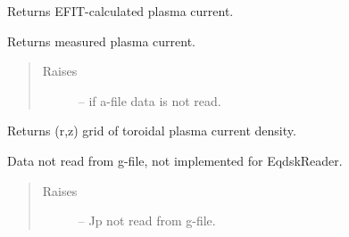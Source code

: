 \documentclass[letterpaper,10pt,english]{sphinxmanual}
\begin{document}
\begin{fulllineitems}
\begin{fulllineitems}
\begin{quote}
\begin{description}
\end{description}\end{quote}

\end{fulllineitems}


\begin{fulllineitems}
\label{eqtools:eqtools.eqdskreader.EqdskReader.getIpCalc}
Returns EFIT-calculated plasma current.

\end{fulllineitems}


\begin{fulllineitems}
\label{eqtools:eqtools.eqdskreader.EqdskReader.getIpMeas}
Returns measured plasma current.
\begin{quote}\begin{description}
\item[{Raises }] \leavevmode
{} -- 
if a-file data is not read.

\end{description}\end{quote}

\end{fulllineitems}


\begin{fulllineitems}
\label{eqtools:eqtools.eqdskreader.EqdskReader.getJp}
Returns (r,z) grid of toroidal plasma current density.

Data not read from g-file, not implemented for EqdskReader.
\begin{quote}\begin{description}
\item[{Raises }] \leavevmode
{} -- 
Jp not read from g-file.

\end{description}\end{quote}

\end{fulllineitems}



\end{fulllineitems}
\end{document}
